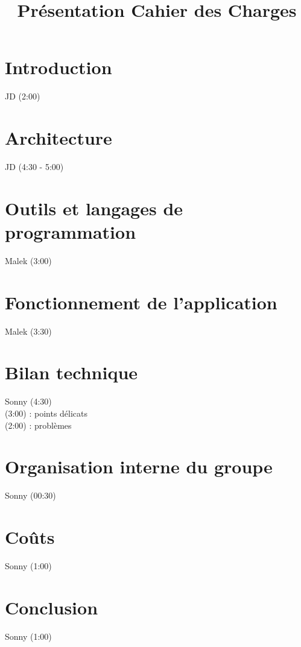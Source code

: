 
\usepackage{../tex/myInfolines}
\usepackage{longtable,array}
\title{Présentation Cahier des Charges}



	\begin{frame}
		\titlepage
	\end{frame}
	
	\section{Introduction}
		\begin{frame}
			JD (2:00)
		\end{frame}
	
	\section{Architecture}
		\begin{frame}
			JD (4:30 - 5:00)
		\end{frame}	
	
	\section{Outils et langages de programmation}
		\begin{frame}
			Malek (3:00)
		\end{frame}
	
	\section{Fonctionnement de l'application}
		\begin{frame}
			Malek (3:30)
		\end{frame}
	
	
	\section{Bilan technique}
		\begin{frame}
			Sonny (4:30)\\
			(3:00) : points délicats\\
			(2:00) : problèmes\\
		\end{frame}
	
	\section{Organisation interne du groupe}
		\begin{frame}
			Sonny (00:30)
		\end{frame}
	
	\section{Coûts}
		\begin{frame}
			Sonny (1:00)
		\end{frame}
	
	\section{Conclusion}
		\begin{frame}
			Sonny (1:00)
		\end{frame}
	

